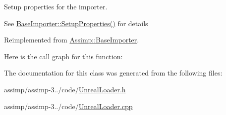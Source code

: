 Setup properties for the importer. 

See \hyperlink{class_assimp_1_1_base_importer_a2ecaa6b808b2b282cb6aa321970a2ad3}{Base\+Importer\+::\+Setup\+Properties()} for details 

Reimplemented from \hyperlink{class_assimp_1_1_base_importer_a2ecaa6b808b2b282cb6aa321970a2ad3}{Assimp\+::\+Base\+Importer}.



Here is the call graph for this function\+:




The documentation for this class was generated from the following files\+:\begin{DoxyCompactItemize}
\item 
assimp/assimp-\/3../code/\hyperlink{_unreal_loader_8h}{Unreal\+Loader.\+h}\item 
assimp/assimp-\/3../code/\hyperlink{_unreal_loader_8cpp}{Unreal\+Loader.\+cpp}\end{DoxyCompactItemize}
